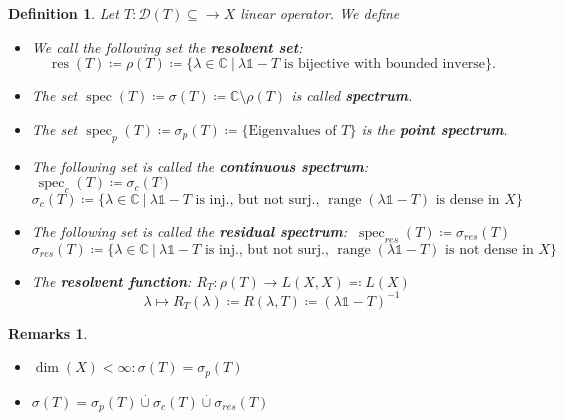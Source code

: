 \documentclass[12pt]{extreport} %
\newcommand{\C}{\mathbb{C}}
\newcommand{\DO}[1]{\mathcal{D}\left( {#1} \right)}
\theoremstyle{named}
\theoremstyle{nnamed}
\theoremstyle{itshape}
\newtheorem{definition}{Definition}  \counterwithin{definition}{chapter}
\theoremstyle{normal}
\newtheorem*{remarks}{Remarks}
\begin{document}
     
\begin{definition}
	Let $T \colon \DO{T} \subseteq  \rightarrow X$ linear operator. We define
	\begin{itemize}
		\item We call the following set the \textbf{resolvent set}:
			$$\operatorname{res}(T) \coloneqq \rho(T) \coloneqq \big\{ \lambda \in \C ~|~\lambda \mathds{1} - T \text{ is bijective with bounded inverse} \big\}. $$
		\item The set $\operatorname{spec}(T) \coloneqq \sigma(T) \coloneqq \C \setminus \rho(T)$ is called \textbf{spectrum}.
		\item The set $\operatorname{spec}_p(T) \coloneqq \sigma_p(T) \coloneqq \big\{ \text{Eigenvalues of } T \big\}$ is the \textbf{point spectrum}.
		\item The following set is called the \textbf{continuous spectrum}: $ ~  \operatorname{spec}_c(T) \coloneqq \sigma_c(T)$
			$$ \sigma_c(T) \coloneqq \big\{ \lambda \in \C ~|~\lambda \mathds{1} - T \text{ is inj., but not surj., } \operatorname{range}(\lambda \mathds{1} - T) \text{ is dense in } X \big\} $$
		\item The following set is called the \textbf{residual spectrum}: $ ~ \operatorname{spec}_{res}(T) \coloneqq \sigma_{res}(T) $
				$$ \sigma_{res}(T) \coloneqq \big\{ \lambda \in \C ~|~\lambda \mathds{1} - T \text{ is inj., but not surj., } \operatorname{range}(\lambda \mathds{1} - T) \text{ is not dense in } X \big\} $$
		\item The \textbf{resolvent function}: $R_T \colon \rho(T) \rightarrow L(X, X) \eqqcolon L(X)$
			$$ \lambda \mapsto R_T(\lambda) \coloneqq R(\lambda, T) \coloneqq \left( \lambda \mathds{1} - T \right)^{-1} $$
	\end{itemize}
\end{definition}

\begin{remarks} ~\
	\begin{itemize}
		\item $\dim(X) < \infty: \sigma(T) = \sigma_p(T)$
		\item $\sigma(T) = \sigma_p(T) \overset{.}{\cup} \sigma_c(T) \overset{.}{\cup} \sigma_{res}(T)$
	\end{itemize}	
\end{remarks} ~\\
\end{document}
